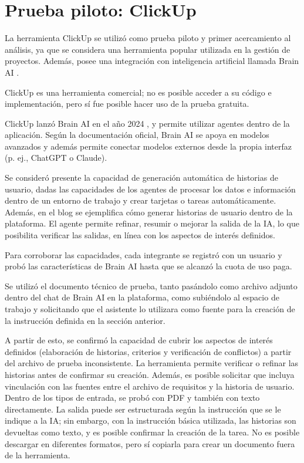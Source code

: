 \section{Prueba piloto: ClickUp}

La herramienta ClickUp \cite{clickup} se utilizó como prueba piloto y primer acercamiento al análisis, ya que se considera una herramienta popular utilizada en la gestión de proyectos. Además, posee una integración con inteligencia artificial llamada Brain AI \cite{brainai}.

ClickUp es una herramienta comercial; no es posible acceder a su código e implementación, pero sí fue posible hacer uso de la prueba gratuita.

ClickUp lanzó Brain AI en el año 2024 \cite{brainai}, y permite utilizar agentes dentro de la aplicación. Según la documentación oficial, Brain AI se apoya en modelos avanzados y además permite conectar modelos externos desde la propia interfaz (p. ej., ChatGPT o Claude). \cite{clickupai,clickupai2} %

Se consideró presente la capacidad de generación automática de historias de usuario, dadas las capacidades de los agentes de procesar los datos e información dentro de un entorno de trabajo y crear tarjetas o tareas automáticamente. Además, en el blog \cite{clickupai3} se ejemplifica cómo generar historias de usuario dentro de la plataforma. El agente permite refinar, resumir o mejorar la salida de la IA, lo que posibilita verificar las salidas, en línea con los aspectos de interés definidos.

Para corroborar las capacidades, cada integrante se registró con un usuario y probó las características de Brain AI hasta que se alcanzó la cuota de uso paga.

Se utilizó el documento técnico de prueba, tanto pasándolo como archivo adjunto dentro del chat de Brain AI en la plataforma, como subiéndolo al espacio de trabajo y solicitando que el asistente lo utilizara como fuente para la creación de la instrucción definida en la sección anterior.

A partir de esto, se confirmó la capacidad de cubrir los aspectos de interés definidos (elaboración de historias, criterios y verificación de conflictos) a partir del archivo de prueba inconsistente. La herramienta permite verificar o refinar las historias antes de confirmar su creación. Además, es posible solicitar que incluya vinculación con las fuentes entre el archivo de requisitos y la historia de usuario. Dentro de los tipos de entrada, se probó con PDF y también con texto directamente. La salida puede ser estructurada según la instrucción que se le indique a la IA; sin embargo, con la instrucción básica utilizada, las historias son devueltas como texto, y es posible confirmar la creación de la tarea. No es posible descargar en diferentes formatos, pero sí copiarla para crear un documento fuera de la herramienta.

